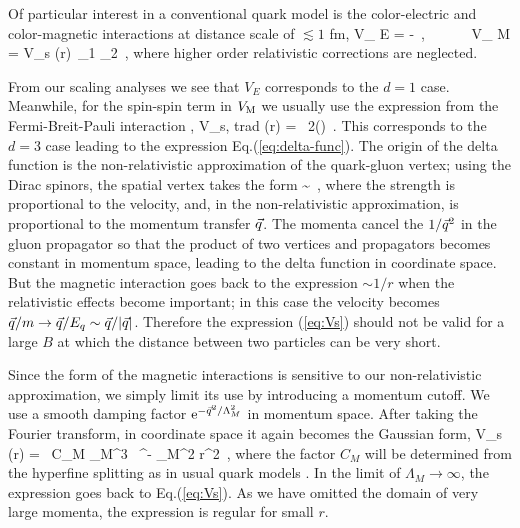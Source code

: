 Of particular interest in a conventional quark model is the color-electric and color-magnetic interactions at distance scale of $\lesssim 1$ fm,
%
\beq
V_{ E} = -   \,,~~~~~~
V_{ M} = V_s (r)\, \vec{\sigma}_1 \cdot \vec{\sigma}_2 \,,
\label{eq:VE_VM}
\eeq
%
where higher order relativistic corrections are neglected. 

From our scaling analyses we see that $V_E$ corresponds to the $d=1$ case.
Meanwhile, for the spin-spin term in $V_{\rm M}$ we usually use the expression from the Fermi-Breit-Pauli interaction \cite{DeRujula:1975qlm,Isgur:1979be},
%
\beq
V_{s, {\rm trad} } (r) =  \, 2\pi \delta (\vr) \,.
\label{eq:Vs}
\eeq
%
This corresponds to the $d=3$ case leading to the expression Eq.(\ref{eq:delta-func}).
The origin of the delta function is the non-relativistic approximation of the quark-gluon vertex; using the Dirac spinors, the spatial vertex takes the form
%
\beq
\sim {} \,,
\eeq
%
where the strength is proportional to the velocity, and, in the non-relativistic approximation, is proportional to the momentum transfer $\vec{q}$. 
The momenta cancel the $1/\vec{q}^2$ in the gluon propagator so that the product of two vertices and propagators becomes constant in momentum space, leading to the delta function in coordinate space. 
But the magnetic interaction goes back to the expression $\sim 1/r$ when the relativistic effects become important; in this case the velocity becomes $\vec{q}/m \rightarrow \vec{q}/E_q \sim \vec{q}/|\vec{q}|$. 
Therefore the expression (\ref{eq:Vs}) should not be valid for a large $B$ at which the distance between two particles can be very short.

Since the form of the magnetic interactions is sensitive to our non-relativistic approximation, we simply limit its use by introducing a momentum cutoff. 
We use a smooth damping factor $\mathrm{e}^{-  \vec{q}^2/\Lambda_M^2}$ in momentum space. 
After taking the Fourier transform, in coordinate space it again becomes the Gaussian form,
%
\beq
V_s (r) =   \, C_M \Lambda_M^3 \, \rme^{- \Lambda_M^2 r^2} \,,
\eeq
%
where the factor $C_M$ will be determined from the hyperfine splitting as in usual quark models \cite{DeRujula:1975qlm,Isgur:1979be}.
In the limit of $\Lambda_M \rightarrow \infty$, the expression goes back to Eq.(\ref{eq:Vs}).
As we have omitted the domain of very large momenta, the expression is regular for small $r$.


